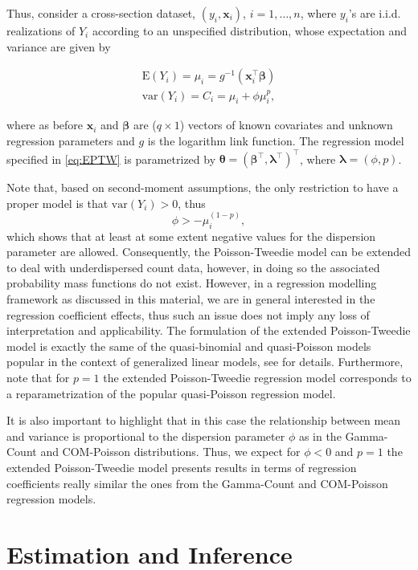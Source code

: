 \documentclass[9pt,a5paper,]{book}
\theoremstyle{definition}
\theoremstyle{definition}
\theoremstyle{remark}
\begin{document}
Thus, consider a cross-section dataset, \((y_i, \boldsymbol{x}_i)\),
\(i = 1, \ldots, n\), where \(y_i\)'s are i.i.d. realizations of \(Y_i\)
according to an unspecified distribution, whose expectation and variance
are given by

\begin{align}
\mathrm{E}(Y_i) = \mu_i = g^{-1}(\boldsymbol{x}_i^{\top} \boldsymbol{\beta}) \nonumber \\
\mathrm{var}(Y_i) = C_i = \mu_i + \phi \mu_i^p,
\label{eq:EPTW}
\end{align}

where as before \(\boldsymbol{x}_i\) and \(\boldsymbol{\beta}\) are
(\(q \times 1\)) vectors of known covariates and unknown regression
parameters and \(g\) is the logarithm link function. The regression
model specified in \eqref{eq:EPTW} is parametrized by
\(\boldsymbol{\theta} = (\boldsymbol{\beta}^\top, \boldsymbol{\lambda}^\top )^\top\),
where \(\boldsymbol{\lambda} = (\phi, p)\).

Note that, based on second-moment assumptions, the only restriction to
have a proper model is that \(\mathrm{var}(Y_i) > 0\), thus
\[\phi > - \mu^{(1-p)}_i,\] which shows that at least at some extent
negative values for the dispersion parameter are allowed. Consequently,
the Poisson-Tweedie model can be extended to deal with underdispersed
count data, however, in doing so the associated probability mass
functions do not exist. However, in a regression modelling framework as
discussed in this material, we are in general interested in the
regression coefficient effects, thus such an issue does not imply any
loss of interpretation and applicability. The formulation of the
extended Poisson-Tweedie model is exactly the same of the quasi-binomial
and quasi-Poisson models popular in the context of generalized linear
models, see \citep[\citet{Nelder1972}]{Wedderburn1974} for details.
Furthermore, note that for \(p = 1\) the extended Poisson-Tweedie
regression model corresponds to a reparametrization of the popular
quasi-Poisson regression model.

It is also important to highlight that in this case the relationship
between mean and variance is proportional to the dispersion parameter
\(\phi\) as in the Gamma-Count and COM-Poisson distributions. Thus, we
expect for \(\phi < 0\) and \(p = 1\) the extended Poisson-Tweedie model
presents results in terms of regression coefficients really similar the
ones from the Gamma-Count and COM-Poisson regression models.

\section{Estimation and Inference}\label{estimation-and-inference}
\end{document}
